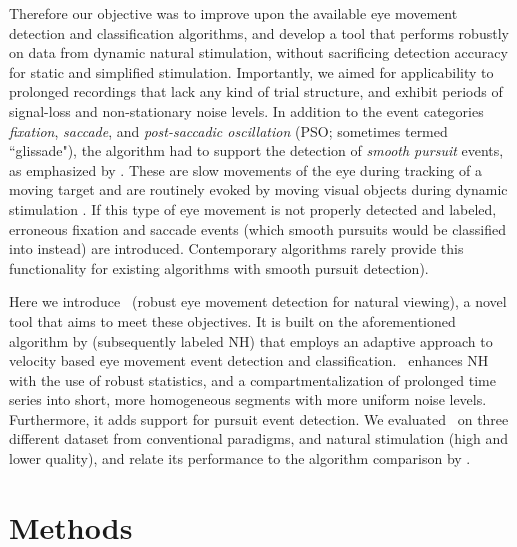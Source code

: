 Therefore our objective was to improve upon the available eye movement
detection and classification algorithms, and develop a tool that performs
robustly on data from dynamic natural stimulation, without sacrificing detection
accuracy for static and simplified stimulation. Importantly, we aimed for
applicability to prolonged recordings that lack any kind of trial structure,
and exhibit periods of signal-loss and non-stationary noise levels.
In addition to the event categories \textit{fixation}, \textit{saccade}, and
\textit{post-saccadic oscillation} (PSO; sometimes termed ``glissade"), the
algorithm had to support the detection of \textit{smooth pursuit} events, as
emphasized by \cite{Andersson2017}.  These are slow movements of the eye during
tracking of a moving target and are routinely evoked by moving visual objects
during dynamic stimulation \citep{carl1987pursuits}.  If this type of eye
movement is not properly detected and labeled, erroneous fixation and saccade
events (which smooth pursuits would be classified into instead) are introduced.
Contemporary algorithms rarely provide this functionality
\cite[but see \eg][]{LARSSON2015145,Komogortsev2013} for existing algorithms with
smooth pursuit detection).

Here we introduce \remodnav\ (robust eye movement detection for natural
viewing), a novel tool that aims to meet these objectives. It is built on the
aforementioned algorithm by \citet{Nystrom2010AnData} (subsequently labeled NH)
that employs an adaptive approach to velocity based eye movement event
detection and classification. \remodnav\ enhances NH with the use of robust
statistics, and a compartmentalization of prolonged time series into short,
more homogeneous segments with more uniform noise levels. Furthermore, it adds
support for pursuit event detection. We evaluated \remodnav\ on three different
dataset from conventional paradigms, and natural stimulation (high and lower
quality), and relate its performance to the algorithm comparison by
\cite{Andersson2017}.


\section*{Methods}\label{methods}



